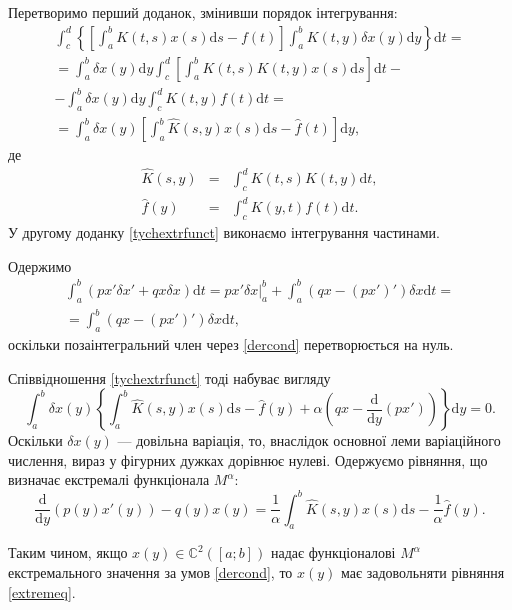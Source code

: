 \documentclass[14pt,twoside]{extreport}
\theoremstyle{mystyle}
\numberwithin{equation}{chapter}
\begin{document}
Перетворимо перший доданок, змінивши порядок інтегрування:
\begin{multline*}
\int_{c}^{d}\left\{\left[\int_{a}^{b}K(t, s)x(s)\mathrm{d}s-f(t)\right]\int_{a}^{b}K(t, y)\delta x(y)\mathrm{d}y\right\}\mathrm{d}t=\\
=\int_{a}^{b}\delta x(y)\mathrm{d}y\int_{c}^{d}\left[\int_{a}^{b}K(t, s)K(t, y)x(s)\mathrm{d}s\right]\mathrm{d}t-\\
-\int_{a}^{b}\delta x(y)\mathrm{d}y\int_{c}^{d}K(t, y)f(t)\mathrm{d}t=\\
=\int_{a}^{b}\delta x(y)\left[\int_{a}^{b}\hat{K}(s, y)x(s)\mathrm{d}s-\hat{f}(t)\right]\mathrm{d}y,
\end{multline*}
де
\begin{equation}\label{hats}
\begin{array}{rll}
\hat{K}(s, y)&=&\displaystyle\int_{c}^{d}K(t, s)K(t, y)\mathrm{d}t,\\
\hat{f}(y)&=&\displaystyle\int_{c}^{d}K(y, t)f(t)\mathrm{d}t.
\end{array}
\end{equation}
У другому доданку \eqref{tychextrfunct} виконаємо інтегрування частинами.

Одержимо
\begin{multline*}
\int_{a}^{b}(px'\delta x'+qx\delta x)\mathrm{d}t=\left.px'\delta x\right|_{a}^{b}+\int_{a}^{b}(qx-(px')')\delta x\mathrm{d}t=\\
=\int_{a}^{b}(qx-(px')')\delta x\mathrm{d}t,
\end{multline*}
оскільки позаінтегральний член через \eqref{dercond} перетворюється на нуль.

Співвідношення \eqref{tychextrfunct} тоді набуває вигляду
$$
\int_{a}^{b}\delta x(y)\left\{\int_{a}^{b}\hat{K}(s, y)x(s)\mathrm{d}s-\hat{f}(y)+\alpha\left(qx-\frac{\mathrm{d}}{\mathrm{d}y}(px')\right)\right\}\mathrm{d}y=0.
$$
Оскільки $\delta x(y)$ — довільна варіація, то, внаслідок основної леми варіаційного числення, вираз у фігурних дужках дорівнює нулеві. Одержуємо рівняння, що визначає екстремалі функціонала $M^{\alpha}$:
\begin{equation}\label{extremeq}
	\displaystyle \frac{\mathrm{d}}{\mathrm{d}y}(p(y)x'(y))-q(y)x(y)=\frac{1}{\alpha}\int_{a}^{b}\hat{K}(s, y)x(s)\mathrm{d}s-\frac{1}{\alpha}\hat{f}(y).
\end{equation}

Таким чином, якщо $x(y) \in \mathbb{C}^2([a; b])$ надає функціоналові $M^{\alpha}$ екстремального значення за умов \eqref{dercond}, то $x(y)$ має задовольняти рівняння \eqref{extremeq}.
\end{document}
